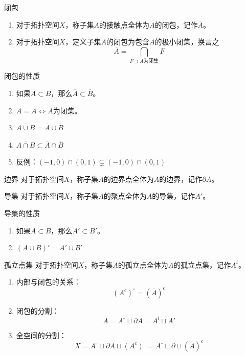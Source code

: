 \documentclass[lang = cn, scheme = chinese, thmcnt = section, usesamecnt]{elegantbook}
\newcommand{\sub}{\subset}             %
\begin{document}
\begin{definition}{闭包}
	\begin{enumerate}
		\item 对于拓扑空间$X$，称子集$A$的接触点全体为$A$的闭包，记作$\overline{A}$。
		\item 对于拓扑空间$X$，定义子集$A$的闭包为包含$A$的极小闭集，换言之%
		$$
		\overline{A}=\bigcap_{F\supset A\text{为闭集}}F
		$$
	\end{enumerate}
\end{definition}

\begin{proposition}{闭包的性质}
	\begin{enumerate}
		\item 如果$A\sub B$，那么$\overline{A}\sub \overline{B}$。
		\item $\overline{A}=A\iff A$为闭集。
		\item $\overline{A\cup B}=\overline{A}\cup \overline{B}$
		\item $\overline{A\cap B}\sub\overline{A}\cap \overline{B}$
		\item 反例：$\overline{(-1,0)\cap (0,1)}\subsetneq\overline{(-1,0)}\cap \overline{(0,1)}$
	\end{enumerate}
\end{proposition}

\begin{definition}{边界}
	对于拓扑空间$X$，称子集$A$的边界点全体为$A$的边界，记作$\partial A$。
\end{definition}

\begin{definition}{导集}
	对于拓扑空间$X$，称子集$A$的聚点全体为$A$的导集，记作$A'$。
\end{definition}

\begin{proposition}{导集的性质}
	\begin{enumerate}
		\item 如果$A\sub B$，那么$A'\sub B'$。
		\item $(A\cup B)'=A'\cup B'$
	\end{enumerate}
\end{proposition}

\begin{definition}{孤立点集}
	对于拓扑空间$X$，称子集$A$的孤立点全体为$A$的孤立点集，记作$A^i$。
\end{definition}

\begin{theorem}
	\begin{enumerate}
		\item 内部与闭包的关系：%
		$$
		(A^c)^\circ=(\overline{A})^c
		$$
		\item 闭包的分割：%
		$$
		\overline{A}
		=A^\circ\sqcup \partial A
		=A^i\sqcup A'
		$$
		\item 全空间的分割：%
		$$
		X
		=A^\circ\sqcup\partial A\sqcup(A^c)^\circ
		=A^\circ\sqcup\partial\sqcup(\overline{A})^c
		$$
	\end{enumerate}
\end{theorem}
\end{document}
